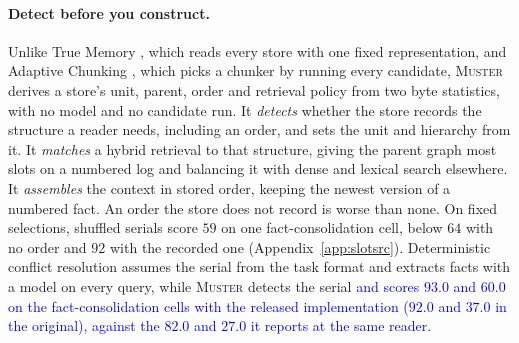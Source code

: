 \documentclass{article}
\newcommand{\nativechange}[1]{\textcolor{blue}{#1}}
\newcommand{\sys}{\textsc{Muster}}
\begin{document}
\paragraph{Detect before you construct.} Unlike True Memory \cite{truememory}, which reads every store with one fixed representation, and Adaptive Chunking \cite{adaptivechunk}, which picks a chunker by running every candidate, \sys{} derives a store's unit, parent, order and retrieval policy from two byte statistics, with no model and no candidate run. It \emph{detects} whether the store records the structure a reader needs, including an order, and sets the unit and hierarchy from it. It \emph{matches} a hybrid retrieval to that structure, giving the parent graph most slots on a numbered log and balancing it with dense and lexical search elsewhere. It \emph{assembles} the context in stored order, keeping the newest version of a numbered fact. An order the store does not record is worse than none. On fixed selections, shuffled serials score $59$ on one fact-consolidation cell, below $64$ with no order and $92$ with the recorded one (Appendix~\ref{app:slotsrc}). Deterministic conflict resolution \cite{freshness} assumes the serial from the task format and extracts facts with a model on every query, while \sys{} detects the serial \nativechange{and scores $93.0$ and $60.0$ on the fact-consolidation cells with the released implementation ($92.0$ and $37.0$ in the original), against the $82.0$ and $27.0$ it reports at the same reader.}
\end{document}
